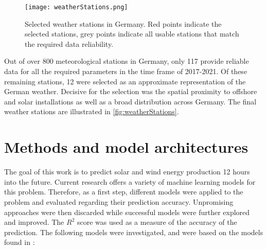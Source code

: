 \documentclass[11pt,table]{article}
\begin{document}
\begin{figure}[p]
	\centering
	\texttt{[image: weatherStations.png]}
	\caption{Selected weather stations in Germany. Red points indicate the selected stations, grey points indicate all usable stations that match the required data reliability.}
	\label{fig:weatherStations}
\end{figure}

Out of over 800 meteorological stations in Germany, only 117 provide reliable data for all the required parameters in the time frame of 2017-2021. Of these remaining stations, 12 were selected as an approximate representation of the German weather. Decisive for the selection was the spatial proximity to offshore and solar installations as well as a broad distribution across Germany. The final weather stations are illustrated in \autoref{fig:weatherStations}.

\section{Methods and model architectures} \label{methods}

The goal of this work is to predict solar and wind energy production 12 hours into the future. Current research offers a variety of machine learning models for this problem. Therefore, as a first step, different models were applied to the problem and evaluated regarding their prediction accuracy. Unpromising approaches were then discarded while successful models were further explored and improved. The $R^2$ score was used as a measure of the accuracy of the prediction. The following models were investigated, and were based on the models found in \cite{TF_Timeseries_forecasting}:
\end{document}
